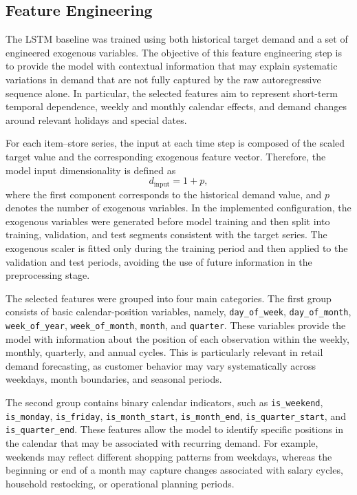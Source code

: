 \subsection{Feature Engineering}
\label{subsec:lstm_feature_engineering}

The LSTM baseline was trained using both historical target demand and a set of engineered exogenous variables. The objective of this feature engineering step is to provide the model with contextual information that may explain systematic variations in demand that are not fully captured by the raw autoregressive sequence alone. In particular, the selected features aim to represent short-term temporal dependence, weekly and monthly calendar effects, and demand changes around relevant holidays and special dates.

For each item--store series, the input at each time step is composed of the scaled target value and the corresponding exogenous feature vector. Therefore, the model input dimensionality is defined as
\[
d_{\text{input}} = 1 + p,
\]
where the first component corresponds to the historical demand value, and \(p\) denotes the number of exogenous variables. In the implemented configuration, the exogenous variables were generated before model training and then split into training, validation, and test segments consistent with the target series. The exogenous scaler is fitted only during the training period and then applied to the validation and test periods, avoiding the use of future information in the preprocessing stage.

The selected features were grouped into four main categories. The first group consists of basic calendar-position variables, namely, \texttt{day\_of\_week}, \texttt{day\_of\_month}, \texttt{week\_of\_year}, \texttt{week\_of\_month}, \texttt{month}, and \texttt{quarter}. These variables provide the model with information about the position of each observation within the weekly, monthly, quarterly, and annual cycles. This is particularly relevant in retail demand forecasting, as customer behavior may vary systematically across weekdays, month boundaries, and seasonal periods.

The second group contains binary calendar indicators, such as \texttt{is\_weekend}, \texttt{is\_monday}, \texttt{is\_friday}, \texttt{is\_month\_start}, \texttt{is\_month\_end}, \texttt{is\_quarter\_start}, and \texttt{is\_quarter\_end}. These features allow the model to identify specific positions in the calendar that may be associated with recurring demand. For example, weekends may reflect different shopping patterns from weekdays, whereas the beginning or end of a month may capture changes associated with salary cycles, household restocking, or operational planning periods.

